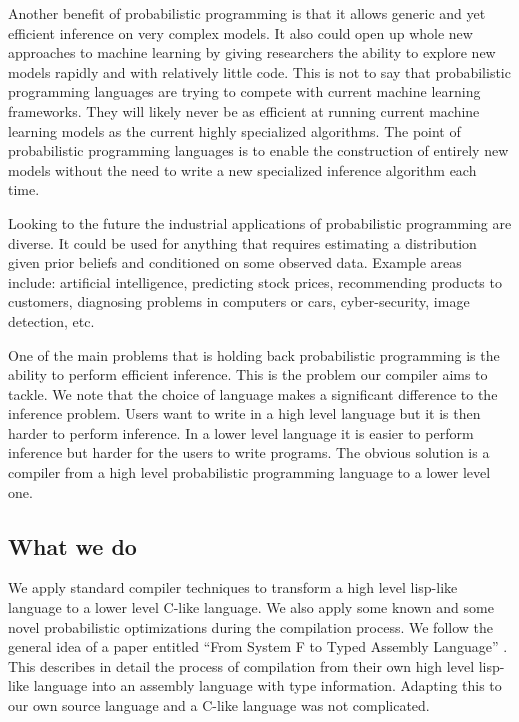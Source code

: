 \documentclass[a4paper]{article}
\begin{document}
Another benefit of probabilistic programming is that it allows generic and yet efficient inference on very complex models. It also could open up whole new approaches to machine learning by giving researchers the ability to explore new models rapidly and with relatively little code. This is not to say that probabilistic programming languages are trying to compete with current machine learning frameworks. They will likely never be as efficient at running current machine learning models as the current highly specialized algorithms. The point of probabilistic programming languages is to enable the construction of entirely new models without the need to write a new specialized inference algorithm each time.

Looking to the future the industrial applications of probabilistic programming are diverse. It could be used for anything that requires estimating a distribution given prior beliefs and conditioned on some observed data. Example areas include: artificial intelligence, predicting stock prices, recommending products to customers, diagnosing problems in computers or cars, cyber-security, image detection, etc.

One of the main problems that is holding back probabilistic programming is the ability to perform efficient inference. This is the problem our compiler aims to tackle. We note that the choice of language makes a significant difference to the inference problem. Users want to write in a high level language but it is then harder to perform inference. In a lower level language it is easier to perform inference but harder for the users to write programs. The obvious solution is a compiler from a high level probabilistic programming language to a lower level one.




\subsection{What we do}

We apply standard compiler techniques to transform a high level lisp-like language to a lower level C-like language. We also apply some known and some novel probabilistic optimizations during the compilation process. We follow the general idea of a paper entitled ``From System F to Typed Assembly Language'' \cite{SystemF}. This describes in detail the process of compilation from their own high level lisp-like language into an assembly language with type information. Adapting this to our own source language and a C-like language was not complicated.
\end{document}
